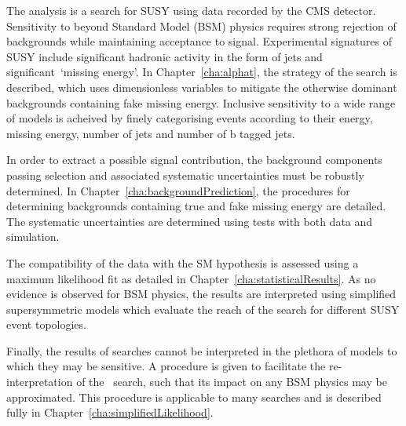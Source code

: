 The \alphat analysis is a search for SUSY using data recorded by the CMS detector. 
Sensitivity to beyond Standard Model (BSM) physics requires strong rejection of backgrounds while
maintaining acceptance to signal. Experimental signatures of SUSY include significant
hadronic activity in the form of jets and significant~`missing energy'. 
In Chapter~\ref{cha:alphat}, the strategy of the \alphat search is described, which uses
dimensionless variables to mitigate the otherwise dominant backgrounds containing fake missing energy.
Inclusive sensitivity to a wide range of models is acheived by finely categorising events according to 
their energy, missing energy, number of jets and number of b tagged jets.

In order to extract a possible signal contribution, the background components passing selection 
and associated systematic uncertainties must be robustly determined. In Chapter~\ref{cha:backgroundPrediction},
the procedures for determining backgrounds containing true and fake missing
energy are detailed. The systematic uncertainties are determined using tests with 
both data and simulation. 

The compatibility of the data with the SM hypothesis is assessed using a maximum likelihood fit 
as detailed in Chapter~\ref{cha:statisticalResults}. As no evidence is observed for BSM physics,
the results are interpreted using simplified supersymmetric models which evaluate the reach
of the search for different SUSY event topologies. 

Finally, the results of searches cannot be interpreted in the plethora of models to which 
they may be sensitive. A procedure is given to facilitate the re-interpretation
of the \alphat~search, such that its impact on any BSM physics may be approximated.
This procedure is applicable to many searches and is described fully in 
Chapter~\ref{cha:simplifiedLikelihood}.

